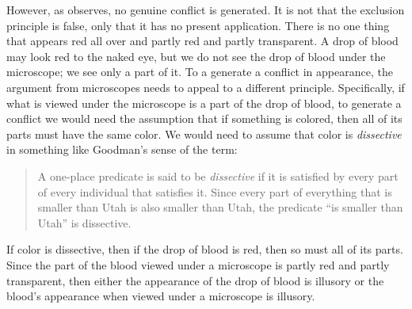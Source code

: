 \documentclass[12pt]{article}
\begin{document}
However, as \citet{Hilbert:1987jq} observes, no genuine conflict is generated. It is not that the exclusion principle is false, only that it has no present application. There is no one thing that appears red all over and partly red and partly transparent. A drop of blood may look red to the naked eye, but we do not see the drop of blood under the microscope; we see only a part of it. To a generate a conflict in appearance, the argument from microscopes needs to appeal to a different principle. Specifically, if what is viewed under the microscope is a part of the drop of blood, to generate a conflict we would need the assumption that if something is colored, then all of its parts must have the same color. We would need to assume that color is \emph{dissective} in something like Goodman's sense of the term:
\begin{quote}
	A one-place predicate is said to be \emph{dissective} if it is satisfied by every part of every individual that satisfies it. Since every part of everything that is smaller than Utah is also smaller than Utah, the predicate ``is smaller than Utah'' is dissective. \citep[53]{Goodman:1951ww}
\end{quote}
If color is dissective, then if the drop of blood is red, then so must all of its parts. Since the part of the blood viewed under a microscope is partly red and partly transparent, then either the appearance of the drop of blood is illusory or the blood's appearance when viewed under a microscope is illusory.
\end{document}

